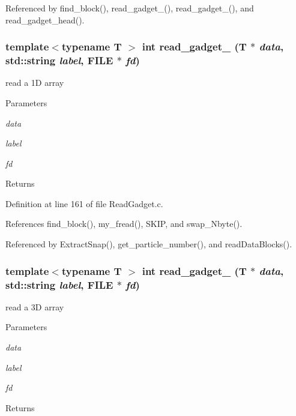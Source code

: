 Referenced by find\_\-block(), read\_\-gadget\_(), read\_\-gadget\_(), and read\_\-gadget\_\-head().

\subsubsection[{read\_\-gadget\_\-1}]{\setlength{\rightskip}{0pt plus 5cm}template$<$typename T $>$ int read\_\-gadget\_ (T $\ast$ {\em data}, \/  std::string {\em label}, \/  FILE $\ast$ {\em fd})}\label{ReadGadget_8h_a82dcfc276c58b845497a7ac210b79fa4}
read a 1D array 
\begin{DoxyParams}{Parameters}
\item[{\em data}]\item[{\em label}]\item[{\em fd}]\end{DoxyParams}
\begin{DoxyReturn}{Returns}

\end{DoxyReturn}


Definition at line 161 of file ReadGadget.c.



References find\_\-block(), my\_\-fread(), SKIP, and swap\_\-Nbyte().



Referenced by ExtractSnap(), get\_\-particle\_\-number(), and readDataBlocks().

\subsubsection[{read\_\-gadget\_\-3}]{\setlength{\rightskip}{0pt plus 5cm}template$<$typename T $>$ int read\_\-gadget\_ (T $\ast$ {\em data}, \/  std::string {\em label}, \/  FILE $\ast$ {\em fd})}\label{ReadGadget_8h_ad94fb9be5ec96b09a94fa083db81463c}
read a 3D array 
\begin{DoxyParams}{Parameters}
\item[{\em data}]\item[{\em label}]\item[{\em fd}]\end{DoxyParams}
\begin{DoxyReturn}{Returns}

\end{DoxyReturn}


